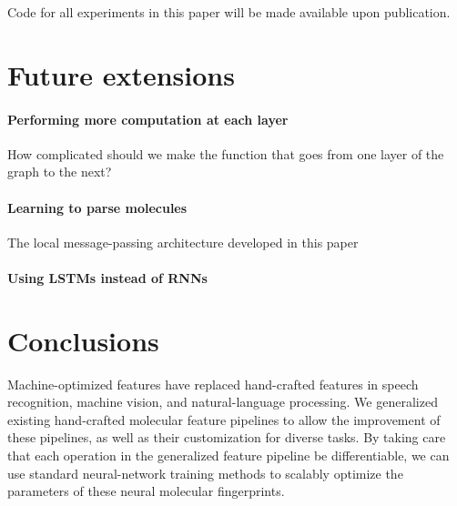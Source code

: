 \documentclass{article}
\begin{document}
Code for all experiments in this paper will be made available upon publication.

\section{Future extensions}
\paragraph{Performing more computation at each layer}
How complicated should we make the function that goes from one layer of the graph to the next?
\paragraph{Learning to parse molecules}
The local message-passing architecture developed in this paper




\paragraph{Using LSTMs instead of RNNs}


\section{Conclusions}
Machine-optimized features have replaced hand-crafted features in speech recognition, machine vision, and natural-language processing.
We generalized existing hand-crafted molecular feature pipelines to allow the improvement of these pipelines, as well as their customization for diverse tasks.
By taking care that each operation in the generalized feature pipeline be differentiable, we can use standard neural-network training methods to scalably optimize the parameters of these neural molecular fingerprints.



\end{document}

